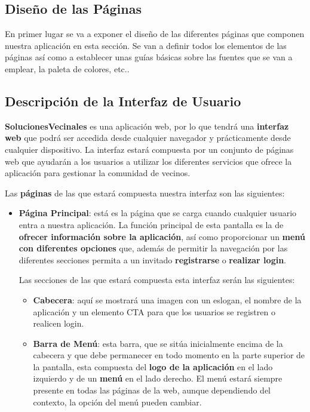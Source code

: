 \subsection{Diseño de las Páginas}
En primer lugar se va a exponer el diseño de las diferentes páginas que componen nuestra aplicación en esta sección. Se van a definir todos los elementos de las páginas así como a establecer unas guías básicas sobre las fuentes que se van a emplear, la paleta de colores, etc..

\newpage

\appendix

\begin{appendices}
	
\section{Descripción de la Interfaz de Usuario}
\label{sec:apenA}
\textbf{SolucionesVecinales} es una aplicación web, por lo que tendrá una \textbf{interfaz web} que podrá ser accedida desde cualquier navegador y prácticamente desde cualquier dispositivo. La interfaz estará compuesta por un conjunto de páginas web que ayudarán a los usuarios a utilizar los diferentes servicios que ofrece la aplicación para gestionar la comunidad de vecinos. 

Las \textbf{páginas} de las que estará compuesta nuestra interfaz son las siguientes:

\begin{itemize}
	\item \textbf{Página Principal}: está es la página que se carga cuando cualquier usuario entra a nuestra aplicación. La función principal de esta pantalla es la de \textbf{ofrecer información sobre la aplicación}, así como proporcionar un\textbf{ menú con diferentes opciones} que, además de permitir la navegación por las diferentes secciones permita a un invitado \textbf{registrarse} o \textbf{realizar \gls{login}}.
	
	Las secciones de las que estará compuesta esta interfaz serán las siguientes:
	
	\begin{itemize}
		\item \textbf{Cabecera}: aquí se mostrará una imagen con un eslogan, el nombre de la aplicación y un elemento \gls{CTA} para que los usuarios se registren o realicen login.
		
		\item \textbf{Barra de Menú}: esta barra, que se sitúa inicialmente encima de la cabecera y que debe permanecer en todo momento en la parte superior de la pantalla, esta compuesta del \textbf{logo de la aplicación} en el lado izquierdo y de un \textbf{menú} en el lado derecho. El menú estará siempre presente en todas las páginas de la web, aunque dependiendo del contexto, la opción del menú pueden cambiar.
		

\end{itemize}
\end{itemize}
\end{appendices}
